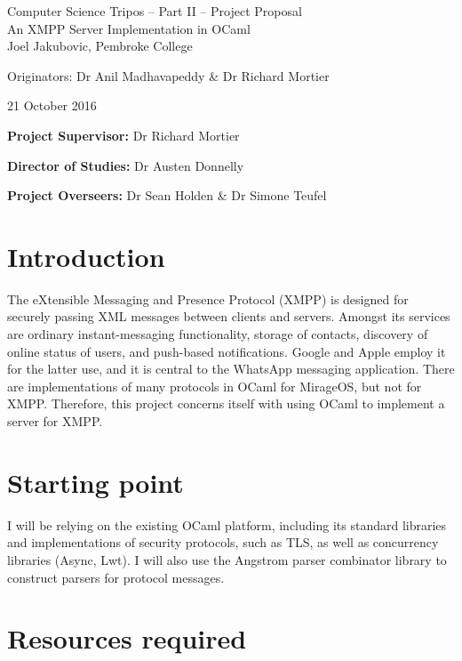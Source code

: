 \documentclass[12pt,a4paper,twoside]{article}
\begin{document}
\begin{center}
\Large
Computer Science Tripos -- Part II -- Project Proposal\\[4mm]
\LARGE
An XMPP Server Implementation in OCaml\\[4mm]

\large
Joel Jakubovic, Pembroke College

Originators: Dr Anil Madhavapeddy \& Dr Richard Mortier

21 October 2016
\end{center}

\vspace{5mm}

\textbf{Project Supervisor:} Dr Richard Mortier

\textbf{Director of Studies:} Dr Austen Donnelly

\textbf{Project Overseers:} Dr Sean Holden  \& Dr Simone Teufel


\section*{Introduction}

The eXtensible Messaging and Presence Protocol (XMPP) is designed for securely
passing XML messages between clients and servers. Amongst its services
are ordinary instant-messaging functionality, storage of contacts, discovery of
online status of users, and push-based notifications. Google and Apple employ
it for the latter use, and it is central to the WhatsApp messaging application.
There are implementations of many protocols in OCaml for MirageOS, but
not for XMPP. Therefore, this project concerns itself with using OCaml to
implement a server for XMPP.

\section*{Starting point}

I will be relying on the existing OCaml platform, including its standard
libraries and implementations of security protocols, such as TLS, as well as
concurrency libraries (Async, Lwt). I will also use the Angstrom parser
combinator library to construct parsers for protocol messages.

\section*{Resources required}
\end{document}
